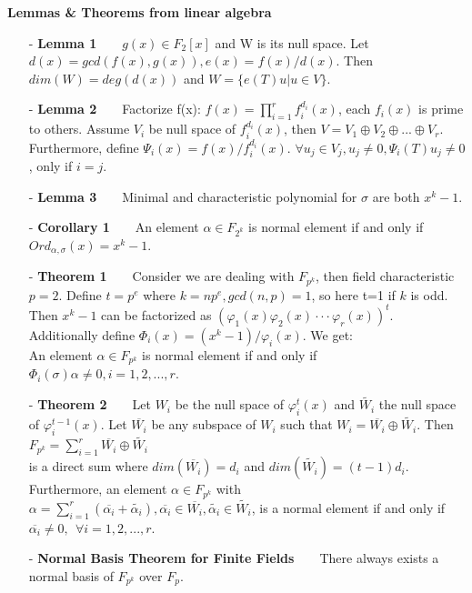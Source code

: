 \documentclass[12pt]{article}
\begin{document}
\textbf{Lemmas \& Theorems from linear algebra}
\begin{itemize}
\item[-] \textbf{Lemma 1}\ \ \ \ $g(x) \in F_2[x]$ and W is its null space. Let $d(x) = gcd(f(x),g(x)), e(x) = f(x)/d(x)$. Then $dim(W) = deg(d(x))$ and $W = \{e(T)u | u \in V\}$.
\item[-] \textbf{Lemma 2}\ \ \ \ Factorize f(x): $f(x) = \prod_{i=1}^{r} f_{i}^{d_i} (x)$, each $f_i(x)$ is prime to others. Assume $V_i$ be null space of $f_{i}^{d_i} (x)$, then $V = V_1\oplus V_2 \oplus ...\oplus V_r$.
Furthermore, define $\Psi_i(x) = f(x)/f_{i}^{d_i} (x)$. $\forall u_j \in V_j, u_j \neq 0, \Psi_i(T)u_j \neq 0$, only if $i = j$.
\item[-] \textbf{Lemma 3}\ \ \ \ Minimal and characteristic polynomial for $\sigma$ are both $x^k - 1$.
\item[-] \textbf{Corollary 1}\ \ \ \ An element $\alpha \in F_{2^k}$ is normal element if and only if $Ord_{\alpha,\sigma}(x) = x^k - 1$.
\item[-] \textbf{Theorem 1}\ \ \ \ Consider we are dealing with $F_{p^k}$, then field characteristic $p = 2$.
				Define $t = p^e$ where $k = np^e, gcd(n,p) = 1$, so here t=1 if $k$ is odd. Then 
			$x^k - 1$ can be factorized as $(\varphi_1(x)\varphi_2(x)\cdot\cdot\cdot\varphi_r(x))^t$.
			Additionally define $\Phi_i(x) = (x^k - 1)/\varphi_i(x)$. We get: \\ 
			An element $\alpha \in 	F_{p^k}$ is normal element if and only if $\Phi_i(\sigma)\alpha \neq 0, i = 1,2,...,r$.
\item[-] \textbf{Theorem 2}\ \ \ \ Let $W_i$ be the null space of $\varphi_{i}^{t} (x)$ and $\widetilde{W_i}$ the
				 null space of $\varphi_{i}^{t-1} (x)$. Let $\overline{W_i}$ be any subspace of
			 $W_i$ such that $W_i = \overline{W_i}\oplus \widetilde{W_i}$. Then\\
			$F_{p^k} = \displaystyle\sum_{i=1}^{r} \overline{W_i}\oplus \widetilde{W_i}$ \\
			is a direct sum where $dim(\overline{W_i}) = d_i$ and $dim(\widetilde{W_i}) = (t-1)d_i$.\\
			Furthermore, an element $\alpha \in F_{p^k}$ with $\alpha = \sum_{i=1}^{r} (\overline{\alpha_i} + \widetilde{\alpha_i}), \overline{\alpha_i} \in \overline{W_i}, \widetilde{\alpha_i} \in \widetilde{W_i}$,
			is a normal element if and only if $\overline{\alpha_i} \neq 0, \ \  \forall i = 1,2,...,r$.
\item[-] \textbf{Normal Basis Theorem for Finite Fields}\ \ \ \ There always exists a normal basis of $F_{p^k}$ over $F_p$.
\end{itemize}
\end{document}

